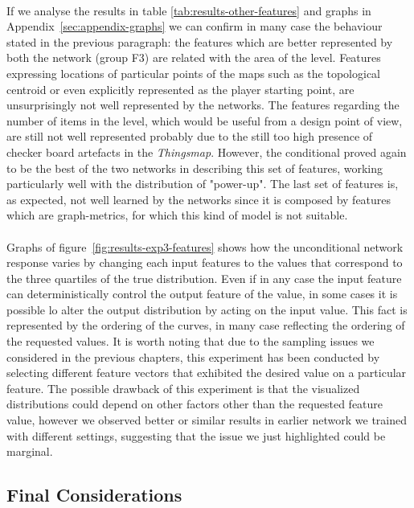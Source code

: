 \paragraph{} If we analyse the results in table \ref{tab:results-other-features} and graphs in Appendix~\ref{sec:appendix-graphs} we can confirm in many case the behaviour stated in the previous paragraph: the features which are better represented by both the network (group F3) are related with the area of the level. Features expressing  locations of particular points of the maps such as the topological centroid or even explicitly represented as the player starting point, are unsurprisingly not well represented by the networks. The features regarding the number of items in the level, which would be useful from a design point of view, are still not well represented probably due to the still too high presence of checker board artefacts in the \textit{Thingsmap}. However, the conditional proved again to be the best of the two networks in describing this set of features, working particularly well with the distribution of "power-up". The last set of features is, as expected, not well learned by the networks since it is composed by features which are graph-metrics, for which this kind of model is not suitable.

\paragraph{} Graphs of figure~\ref{fig:results-exp3-features} shows how the unconditional network response varies by changing each input features to the values that correspond to the three quartiles of the true distribution. Even if in any case the input feature can deterministically control the output feature of the value, in some cases it is possible lo alter the output distribution by acting on the input value. This fact is represented by the ordering of the curves, in many case reflecting the ordering of the requested values. It is worth noting that due to the sampling issues we considered in the previous chapters, this experiment has been conducted by selecting different feature vectors that exhibited the desired value on a particular feature. The possible drawback of this experiment is that the visualized distributions could depend on other factors other than the requested feature value, however we observed better or similar results in earlier network we trained with different settings, suggesting that the issue we just highlighted could be marginal.

 
\subsection{Final Considerations}
